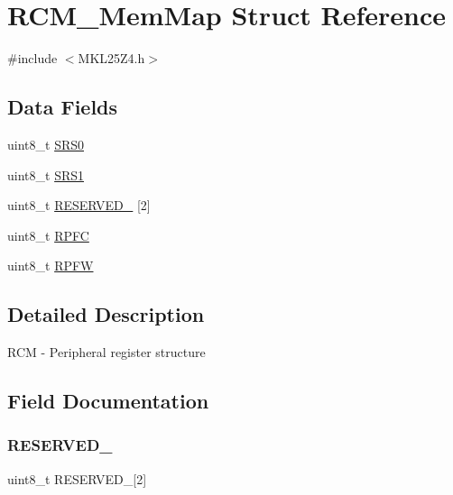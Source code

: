 \hypertarget{struct_r_c_m___mem_map}{}\section{R\+C\+M\+\_\+\+Mem\+Map Struct Reference}
\label{struct_r_c_m___mem_map}


{\ttfamily \#include $<$M\+K\+L25\+Z4.\+h$>$}

\subsection*{Data Fields}
\begin{DoxyCompactItemize}
\item 
uint8\+\_\+t \hyperlink{struct_r_c_m___mem_map_a72cc435004865ba66a0ca44630f10fd3}{S\+R\+S0}
\item 
uint8\+\_\+t \hyperlink{struct_r_c_m___mem_map_a17104acf49b7e08ee75c675987528f92}{S\+R\+S1}
\item 
uint8\+\_\+t \hyperlink{struct_r_c_m___mem_map_a1d386ff4b328960f430b4c63f61423fa}{R\+E\+S\+E\+R\+V\+E\+D\+\_} \mbox{[}2\mbox{]}
\item 
uint8\+\_\+t \hyperlink{struct_r_c_m___mem_map_afbe59a267584c8d35fe61a861e753155}{R\+P\+FC}
\item 
uint8\+\_\+t \hyperlink{struct_r_c_m___mem_map_a8c3111caa4359258a32cb7db2b456445}{R\+P\+FW}
\end{DoxyCompactItemize}


\subsection{Detailed Description}
R\+CM -\/ Peripheral register structure 

\subsection{Field Documentation}
\mbox{\label{struct_r_c_m___mem_map_a1d386ff4b328960f430b4c63f61423fa}} 
\subsubsection{\texorpdfstring{R\+E\+S\+E\+R\+V\+E\+D\+\_}{RESERVED\_0}}
{\footnotesize\ttfamily uint8\+\_\+t R\+E\+S\+E\+R\+V\+E\+D\+\_\mbox{[}2\mbox{]}}

